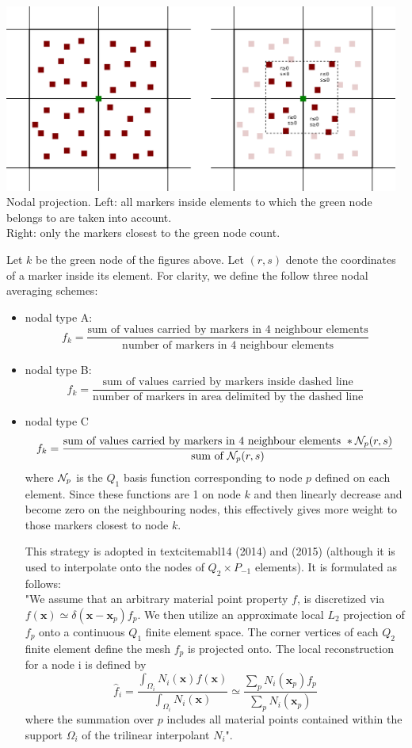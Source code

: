 \begin{center}
\includegraphics[width=13cm]{python_codes/fieldstone_13/images/markers2}\\
{\captionfont Nodal projection. 
Left: all markers inside elements to which the green node belongs to are taken into account.\\
Right: only the markers closest to the green node count.}
\end{center}

Let $k$ be the green node of the figures above. Let $(r,s)$ 
denote the coordinates of a marker inside its element.
For clarity, we define the follow three nodal averaging schemes:
\begin{itemize}
\item nodal type A: 
\[
f_k = \frac{\text{sum of values carried by markers in 4 neighbour elements}}
{\text{number of markers in 4 neighbour elements}}
\]
\item nodal type B: 
\[
f_k = \frac{\text{sum of values carried by markers inside dashed line}}
{\text{number of markers in area delimited by the dashed line}}
\]
\item nodal type C 
\[
f_k = \frac{\text{sum of values carried by markers in 4 neighbour elements } * {\mathcal{N}}_p(r,s)}
{\text{sum of }{\mathcal{N}}_p(r,s)} 
\]
where ${\mathcal{N}}_p$ is the $Q_1$ basis function corresponding to node $p$ 
defined on each element. Since these 
functions are 1 on node $k$ and then linearly decrease and become zero on 
the neighbouring nodes, this
effectively gives more weight to those markers closest to node $k$.

This strategy is adopted in textcite{mabl14} (2014) and \textcite{mabl15} (2015) 
(although it is used to interpolate onto the nodes of $Q_2 \times P_{-1}$ elements). 
It is formulated as follows:\\
"We assume that an arbitrary material point property $f$, is discretized via 
$f(\bm x)\simeq \delta(\bm x - \bm x_p) f_p$. We then utilize an approximate local $L_2$ projection
of $f_p$ onto a continuous $Q_1$ finite element space. The corner vertices of
each $Q_2$ finite element define the mesh $f_p$ is projected onto.
The local reconstruction for a node i is defined by
\[
\hat{f}_i = \frac{\int_{\Omega_i}N_i(\bm x) f(\bm x)}{\int_{\Omega_i} N_i(\bm x)} \simeq
\frac{\sum_p N_i(\bm x_p) f_p }{\sum_p N_i(\bm x_p)}
\]
where the summation over $p$ includes all material points 
contained within the support $\Omega_i$ of the trilinear interpolant $N_i$".
\end{itemize}

